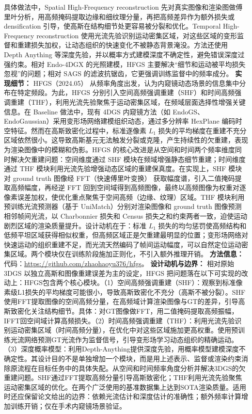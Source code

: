 具体做法中，Spatial High-Frequency reconstruction 先对真实图像和渲染图做傅里叶分析，用高频掩码提取边缘和细纹理分量，再把高频差异作为额外损失或 densification 引导，使高斯在结构细节处更容易被分裂和优化。Temporal High-Frequency reconstruction 使用光流先验识别运动密集区域，对这些区域的变形监督和重建损失加权，让动态组织的快速变化不被静态背景淹没。方法还使用 Depth Anything 等深度先验，并以概率方式建模深度不确定性，避免错误深度过强约束。相对 Endo-4DGX 的光照建模，HFGS 主要解决“细节和运动被平均损失忽视”的问题；相对 SAGS 的滤波抗锯齿，它更强调训练监督中的频率成分。
\textbf{实现细节：} HFGS（2024.05） 从频率角度出发，认为内窥镜动态场景的信息集中分布在特定频段。为此，HFGS 分别引入空间高频强调重建（SHF）和时间高频强调重建（THF），利用光流先验聚焦于运动密集区域，在频域层面选择性增强关键信息。在 Baseline 做法中，现有 4DGS 内窥镜方法（如 EndoGS、EndoGaussian）采用变形场网络建模组织动态，通过多分辨率 HexPlane 编码时空特征。然而在高斯致密化过程中，标准逐像素 $L_1$ 损失的平均梯度在重建不充分区域依然很小。这导致高斯基元无法触发分裂或克隆，产生持续性的欠重建，表现为渲染图像中的模糊和伪影。HFGS 的核心改进是从空间和时间两个频率维度同时解决欠重建问题：空间维度通过 SHF 模块在频域增强静态细节重建；时间维度通过 THF 模块利用光流先验增强动态区域的重建保真度。在实现上，SHF 模块对 ground truth 图像经 FFT（快速傅里叶变换） 获取幅度谱，引入二值掩码提取高频幅度，再经逆 FFT 回到空间域得到高频图像，最终以高频图像为权重对逐像素误差加权，使优化重点聚焦于空间高频（边缘、纹理）区域。THF 模块利用预训练光流预测器（基于 UniMatch）分别对渲染图像和 ground truth 图像预测相邻帧间光流，以 Charbonnier 损失和 Census 损失之和约束两者一致，迫使运动剧烈区域的渲染质量提升。设计动机在于：标准 $L_1$ 损失的均匀惩罚使高频结构和低频平坦区域获得相似权重，但高频区域正是欠重建最明显的位置；变形场网络对快速运动的组织重建不足，而光流天然编码了帧间运动幅度，可以自然定位运动密集区域。两个模块仅在训练阶段施加正则化，不引入额外推理开销。
\textbf{方法信息：} 代码：\url{https://github.com/zhaohaoyu376/hfgs}。
\textbf{设计动机与边界：} 相对原始 3DGS 以独立高斯和图像重建误差为主的设定，HFGS 把问题落在以下可实现的改动上：HFGS包含两个核心模块。（1）空间高频强调重建（SHF）：观察到标准像素级L1损失的平均梯度可能很小，导致高斯致密化不充分（高斯不被分裂）。SHF使用FFT提取图像的空间高频分量，在高频域计算渲染图像与GT的差异，引导高斯致密化关注结构细节。具体：对GT图像做FFT，用二值掩码提取高频振幅，IFFT回空间域计算高频损失。（2）时间高频强调重建（THF）：利用光流先验识别运动密集区域（时间高频分量），在优化中对这些区域施加更高权重。使用预训练光流网络预测GT光流作为监督信号，引导变形场学习动态组织的精确运动。（3）深度概率模型：利用Depth-Anything提供深度先验，用概率模型建模深度不确定性。其设计目的不是单独增加一个模块，而是用上述表示、监督或渲染约束消除原流程在目标任务中的具体失配。从空间和时间频率角度分析并解决3DGS的欠重建问题。SHF通过FFT提取高频分量引导高斯致密化；THF利用光流先验聚焦运动密集区域的优化。在两个广泛使用的基准数据集上达到SOTA渲染质量。适用时还应保留论文给出的边界：依赖光流估计和深度估计的准确性；额外频率计算增加训练开销；仅在手术内窥镜场景验证。
